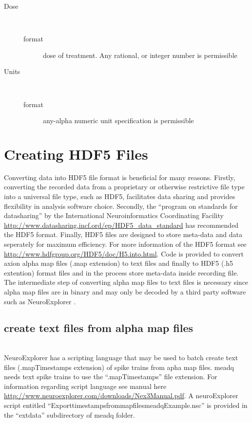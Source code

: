 \documentclass{article}\usepackage[]{graphicx}\usepackage[]{color}
\begin{document}
\begin{description}
\item[Dose] \mbox{}\\
\begin{description}
\item[format] dose of treatment. Any rational, or integer number is permissible 
\end{description}

\item[Units] \mbox{}\\
\begin{description}
\item[format] any-alpha numeric unit specification is permissible 
\end{description}

\end{description}






\section*{Creating HDF5 Files}
Converting data into HDF5 file format is beneficial for many reasons. Firstly, converting the recorded data from a proprietary or otherwise restrictive file type into a universal file type, such as HDF5, facilitates data sharing and provides flexibility in analysis software choice.  Secondly, the ``program on standards for datasharing'' by the International Neuroinformatics Coordinating Facility \url{ http://www.datasharing.incf.ord/ep/HDF5_data_standard} has recommended the HDF5 format. Finally, HDF5 files are designed to store meta-data and data seperately for maximum efficiency. For more information of the HDF5 format see \url{http://www.hdfgroup.org/HDF5/doc/H5.into.html}.
 Code is provided to convert axion alpha map files (.map extension) to text files and finally to HDF5 (.h5 extention) format files and in the process store meta-data inside recording file. The intermediate step of converting alpha map files to text files is necessary since alpha map files are in binary and may only be decoded by a third party software such as NeuroExplorer \citep{neuroexplorer}.

\subsection{create text files from alpha map files} \mbox{}\\
NeuroExplorer has a scripting language that may be used to batch create text files (.mapTimestamps extension) of spike trains from apha map files.  meadq needs text spike trains to use the ``.mapTimestamps'' file extension.  For information regarding script language see manual
here \url{http://www.neuroexplorer.com/downloads/Nex3Manual.pdf}.  A neuroExplorer script entitled ``Export\textunderscore timestamps\textunderscore from\textunderscore map\textunderscore files\textunderscore meadqExample.nsc'' is provided in the ``extdata'' subdirectory of
meadq folder. 
\end{document}

